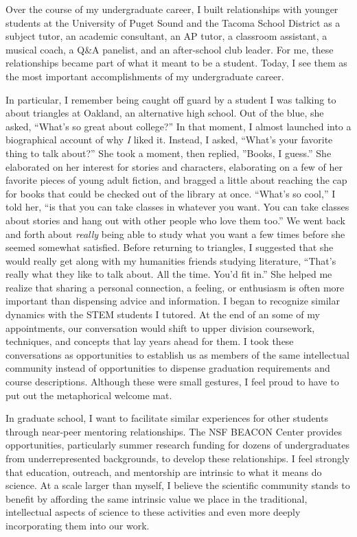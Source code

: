 Over the course of my undergraduate career, I built relationships with younger students at the University of Puget Sound and the Tacoma School District as a subject tutor, an academic consultant, an AP tutor, a classroom assistant, a musical coach, a Q\&A panelist, and an after-school club leader.
For me, these relationships became part of what it meant to be a student.
Today, I see them as the most important accomplishments of my undergraduate career.

In particular, I remember being caught off guard by a student I was talking to about triangles at Oakland, an alternative high school.
Out of the blue, she asked, ``What's so great about college?''
In that moment, I almost launched into a biographical account of why \textit{I} liked it.
Instead, I asked, ``What's your favorite thing to talk about?''
She took a moment, then replied, ''Books, I guess.''
She elaborated on her interest for stories and characters, elaborating on a few of her favorite pieces of young adult fiction, and bragged a little about reaching the cap for books that could be checked out of the library at once.
``What's so cool,'' I told her, ``is that you can take classes in whatever you want.
You can take classes about stories and hang out with other people who love them too.''
We went back and forth about \textit{really} being able to study what you want a few times before she seemed somewhat satisfied.
Before returning to triangles, I suggested that she would really get along with my humanities friends studying literature,
``That's really what they like to talk about.
All the time.
You'd fit in.''
She helped me realize that sharing a personal connection, a feeling, or enthusiasm is often more important than dispensing advice and information.
I began to recognize similar dynamics with the STEM students I tutored.
At the end of an some of my appointments, our conversation would shift to upper division coursework, techniques, and concepts that lay years ahead for them.
I took these conversations as opportunities to establish us as members of the same intellectual community instead of opportunities to dispense graduation requirements and course descriptions.
Although these were small gestures, I feel proud to have to put out the metaphorical welcome mat.

In graduate school, I want to facilitate similar experiences for other students through near-peer mentoring relationships.
The NSF BEACON Center provides opportunities, particularly summer research funding for dozens of undergraduates from underrepresented backgrounds, to develop these relationships.
I feel strongly that education, outreach, and mentorship are intrinsic to what it means do science.
At a scale larger than myself, I believe the scientific community stands to benefit by affording the same intrinsic value we place in the traditional, intellectual aspects of science to these activities and even more deeply incorporating them into our work.

